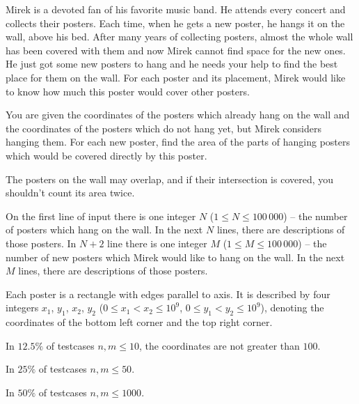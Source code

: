 

\usepackage{tikz}





Mirek is a devoted fan of his favorite music band.
He attends every concert and collects their posters.
Each time, when he gets a new poster, he hangs it on the wall, above his bed.
After many years of collecting posters, almost the whole wall has been covered with them
	and now Mirek cannot find space for the new ones.
He just got some new posters to hang and he needs your help to find the best place for them on the wall.
For each poster and its placement, Mirek would like to know how much this poster would cover other posters.


You are given the coordinates of the posters which already hang on the wall
	and the coordinates of the posters which do not hang yet, but Mirek considers hanging them.
For each new poster, find the area of the parts of hanging posters which would be covered directly by this poster.

The posters on the wall may overlap, and if their intersection is covered, you shouldn't count its area twice.


On the first line of input there is one integer $N$ ($1 \le N \le 100\,000$)
	-- the number of posters which hang on the wall.
In the next $N$ lines, there are descriptions of those posters.
In $N+2$ line there is one integer $M$ ($1 \le M \le 100\,000$)
	-- the number of new posters which Mirek would like to hang on the wall.
In the next $M$ lines, there are descriptions of those posters.

Each poster is a rectangle with edges parallel to axis.
It is described by four integers $x_1$, $y_1$, $x_2$, $y_2$
	($0 \le x_1 < x_2 \le 10^9$, $0 \le y_1 < y_2 \le 10^9$),
	denoting the coordinates of the bottom left corner and the top right corner.

In $12.5\%$ of testcases $n, m \le 10$, the coordinates are not greater than $100$.

In $25\%$ of testcases $n, m \le 50$.

In $50\%$ of testcases $n, m \le 1000$.

